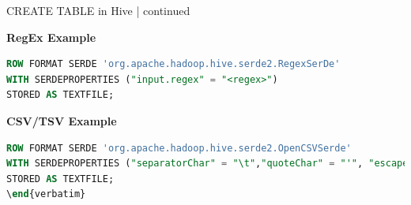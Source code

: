 \begin{frame}[fragile]{CREATE TABLE in Hive | continued}


\textbf{RegEx Example}
\begin{lstlisting}[caption={RegEx Example},language=SQL]
ROW FORMAT SERDE 'org.apache.hadoop.hive.serde2.RegexSerDe'
WITH SERDEPROPERTIES ("input.regex" = "<regex>")
STORED AS TEXTFILE;
\end{lstlisting}
  
\textbf{CSV/TSV Example}
\begin{lstlisting}[caption={CSV/TSV Example},language=SQL]
ROW FORMAT SERDE 'org.apache.hadoop.hive.serde2.OpenCSVSerde'
WITH SERDEPROPERTIES ("separatorChar" = "\t","quoteChar" = "'", "escapeChar" = "\\")
STORED AS TEXTFILE;
\end{verbatim}
\end{lstlisting}	  


  \end{frame}
  

